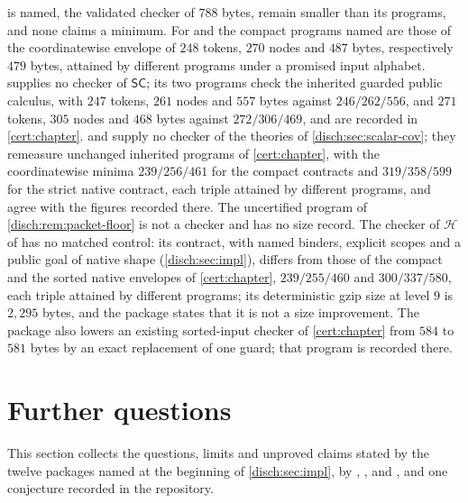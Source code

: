 is named, the validated checker of $788$ bytes, remain smaller than its
programs, and none claims a minimum. For  and
 the compact programs named are those of the
coordinatewise envelope of $248$ tokens, $270$ nodes and $487$ bytes,
respectively $479$ bytes, attained by different programs under a promised
input alphabet.  supplies no checker of
$\mathsf{SC}$; its two programs check the inherited guarded public calculus,
with $247$ tokens, $261$ nodes and $557$ bytes against $246/262/556$, and
$271$ tokens, $305$ nodes and $468$ bytes against $272/306/469$, and are
recorded in \cref{cert:chapter}.  and
 supply no checker of the theories of
\cref{disch:sec:scalar-cov}; they remeasure unchanged inherited programs of
\cref{cert:chapter}, with the coordinatewise minima $239/256/461$ for the
compact contracts and $319/358/599$ for the strict native contract, each
triple attained by different programs, and agree with the figures recorded
there. The uncertified program of \cref{disch:rem:packet-floor} is not a
checker and has no size record. The checker of $\mathcal H$ of
 has no matched control: its contract, with
named binders, explicit scopes and a public goal of native shape
(\cref{disch:sec:impl}), differs from those of the compact and the sorted
native envelopes of \cref{cert:chapter}, $239/255/460$ and $300/337/580$,
each triple attained by different programs; its deterministic gzip size at
level $9$ is $2{,}295$ bytes, and the package states that it is not a size
improvement. The package also lowers an existing sorted-input checker of
\cref{cert:chapter} from $584$ to $581$ bytes by an exact replacement of one
guard; that program is recorded there.

\section{Further questions}
\label{disch:sec:further}

This section collects the questions, limits and unproved claims stated by
the twelve packages named at the beginning of \cref{disch:sec:impl}, by
, ,
 and , and one
conjecture recorded in the repository.


